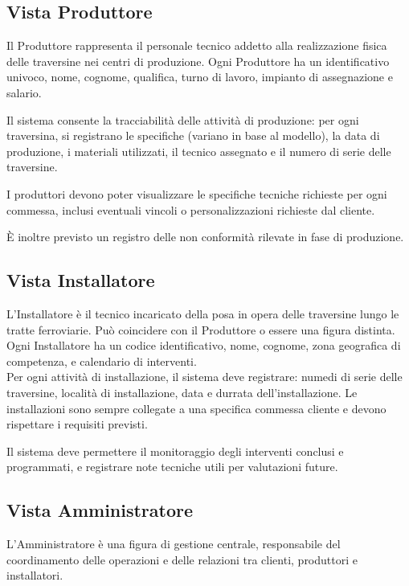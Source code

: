\documentclass{article}
\begin{document}
\subsection{Vista Produttore}
Il Produttore rappresenta il personale tecnico addetto alla realizzazione fisica delle traversine nei centri di produzione. Ogni Produttore ha un identificativo univoco, nome, cognome, qualifica, turno di lavoro, impianto di assegnazione e salario.

\noindent Il sistema consente la tracciabilità delle attività di produzione: per ogni traversina, si registrano le specifiche (variano in base al modello), la data di produzione, i materiali utilizzati, il tecnico assegnato e il numero di serie delle traversine.

\noindent I produttori devono poter visualizzare le specifiche tecniche richieste per ogni commessa, inclusi eventuali vincoli o personalizzazioni richieste dal cliente.

\noindent È inoltre previsto un registro delle non conformità rilevate in fase di produzione.

\subsection{Vista Installatore}
L’Installatore è il tecnico incaricato della posa in opera delle traversine lungo le tratte ferroviarie. Può coincidere con il Produttore o essere una figura distinta. Ogni Installatore ha un codice identificativo, nome, cognome, zona geografica di competenza, e calendario di interventi.\\

\noindent Per ogni attività di installazione, il sistema deve registrare: numedi di serie delle traversine, località di installazione, data e durrata dell'installazione. Le installazioni sono sempre collegate a una specifica commessa cliente e devono rispettare i requisiti previsti.

\noindent Il sistema deve permettere il monitoraggio degli interventi conclusi e programmati, e registrare note tecniche utili per valutazioni future.

\subsection{Vista Amministratore}
L’Amministratore è una figura di gestione centrale, responsabile del coordinamento delle operazioni e delle relazioni tra clienti, produttori e installatori.\\
\end{document}
